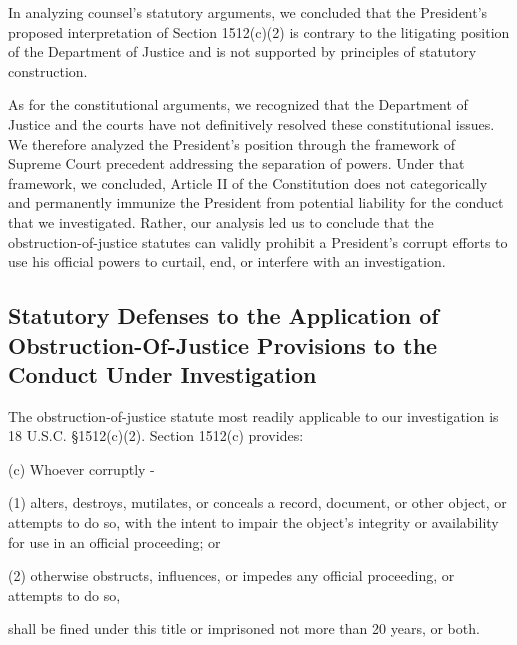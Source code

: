 In analyzing counsel’s statutory arguments, we concluded that the President’s proposed interpretation of Section 1512(c)(2) is contrary to the litigating position of the Department of Justice and is not supported by principles of statutory construction.

As for the constitutional arguments, we recognized that the Department of Justice and the courts have not definitively resolved these constitutional issues.
We therefore analyzed the President’s position through the framework of Supreme Court precedent addressing the separation of powers.
Under that framework, we concluded, Article II of the Constitution does not categorically and permanently immunize the President from potential liability for the conduct that we investigated.
Rather, our analysis led us to conclude that the obstruction-of-justice statutes can validly prohibit a President’s corrupt efforts to use his official powers to curtail, end, or interfere with an investigation.

\subsection{Statutory Defenses to the Application of Obstruction-Of-Justice Provisions to the Conduct Under Investigation}

The obstruction-of-justice statute most readily applicable to our investigation is 18 U.S.C. \S 1512(c)(2). Section 1512(c) provides:

(c) Whoever corruptly -

(1) alters, destroys, mutilates, or conceals a record, document, or other object, or attempts to do so, with the intent to impair the object’s integrity or availability for use in an official proceeding; or

(2) otherwise obstructs, influences, or impedes any official proceeding, or attempts to do so,

shall be fined under this title or imprisoned not more than 20 years, or both.

